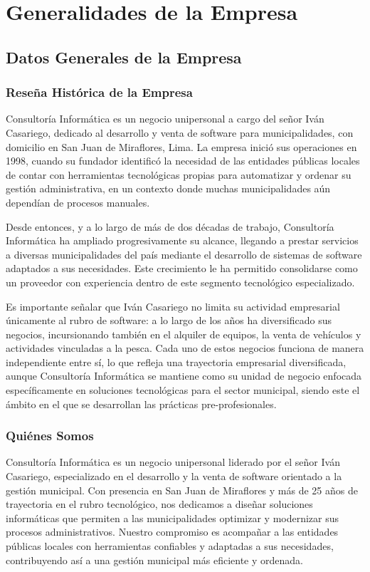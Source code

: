 \documentclass[12pt,a4paper]{report}
\begin{document}
\chapter{Generalidades de la Empresa}

\section{Datos Generales de la Empresa}

\subsection{Reseña Histórica de la Empresa}
Consultoría Informática es un negocio unipersonal a cargo del señor Iván Casariego, dedicado al desarrollo y venta de software para municipalidades, con domicilio en San Juan de Miraflores, Lima. La empresa inició sus operaciones en 1998, cuando su fundador identificó la necesidad de las entidades públicas locales de contar con herramientas tecnológicas propias para automatizar y ordenar su gestión administrativa, en un contexto donde muchas municipalidades aún dependían de procesos manuales.

Desde entonces, y a lo largo de más de dos décadas de trabajo, Consultoría Informática ha ampliado progresivamente su alcance, llegando a prestar servicios a diversas municipalidades del país mediante el desarrollo de sistemas de software adaptados a sus necesidades. Este crecimiento le ha permitido consolidarse como un proveedor con experiencia dentro de este segmento tecnológico especializado.

Es importante señalar que Iván Casariego no limita su actividad empresarial únicamente al rubro de software: a lo largo de los años ha diversificado sus negocios, incursionando también en el alquiler de equipos, la venta de vehículos y actividades vinculadas a la pesca. Cada uno de estos negocios funciona de manera independiente entre sí, lo que refleja una trayectoria empresarial diversificada, aunque Consultoría Informática se mantiene como su unidad de negocio enfocada específicamente en soluciones tecnológicas para el sector municipal, siendo este el ámbito en el que se desarrollan las prácticas pre-profesionales.

\subsection{Quiénes Somos}
Consultoría Informática es un negocio unipersonal liderado por el señor Iván Casariego, especializado en el desarrollo y la venta de software orientado a la gestión municipal. Con presencia en San Juan de Miraflores y más de 25 años de trayectoria en el rubro tecnológico, nos dedicamos a diseñar soluciones informáticas que permiten a las municipalidades optimizar y modernizar sus procesos administrativos. Nuestro compromiso es acompañar a las entidades públicas locales con herramientas confiables y adaptadas a sus necesidades, contribuyendo así a una gestión municipal más eficiente y ordenada.
\end{document}
